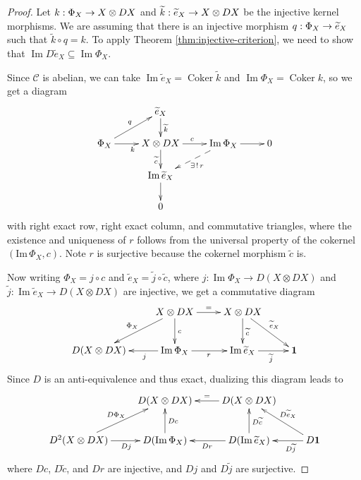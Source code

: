 \documentclass[11pt, reqno]{amsart}
\theoremstyle{definition}\newtheorem{defi}[thm]{Definition}
\theoremstyle{definition}\newtheorem{rem}[thm]{Remark}
\theoremstyle{definition}\newtheorem{exam}[thm]{Example}
\theoremstyle{definition}\newtheorem{assum}[thm]{Assumption}
\newcommand{\cC}{\mathcal{C}}
\newcommand{\til}{\widetilde}
\newcommand{\vac}{\mathbf{1}}
\DeclareMathOperator{\im}{Im}
\DeclareMathOperator{\coker}{Coker}
\let\ker\relax
\DeclareMathOperator{\ker}{Ker}
\begin{document}
\begin{proof}
Let $k: \ker\Phi_X\rightarrow X\otimes DX$ and $\til{k}: \ker\til{e}_X\rightarrow X\otimes DX$ be the injective kernel morphisms. We are assuming that there is an injective morphism $q: \ker\Phi_X\rightarrow\ker\til{e}_X$ such that $\til{k}\circ q=k$. To apply Theorem \ref{thm:injective-criterion}, we need to show that $\im D\til{e}_X\subseteq\im\Phi_X$.

Since $\cC$ is abelian, we can take $\im\til{e}_X=\coker \til{k}$ and $\im\Phi_X =\coker k$, so we get a diagram
\begin{equation*}
\xymatrixrowsep{1.5pc}
\xymatrix{
& \ker\til{e}_X \ar[d]^{\til{k}} & &\\
\ker\Phi_X \ar[ru]^q \ar[r]_k & X\otimes DX \ar[d]_{\til{c}} \ar[r]^c & \im\Phi_X \ar[r] \ar@{-->}[ld]^{\exists\,!\,r} & 0\\
& \im\til{e}_X \ar[d] &&\\
& 0 &&\\
}
\end{equation*}
with right exact row, right exact column, and commutative triangles, where the existence and uniqueness of $r$ follows from the universal property of the cokernel $(\mathrm{Im}\,\Phi_X,c)$.
Note $r$ is surjective because the cokernel morphism $\til{c}$ is. 

Now writing $\Phi_X=j\circ c$ and $\til{e}_X=\til{j}\circ\til{c}$, where $j:\im\Phi_X\rightarrow D(X\otimes DX)$ and $\til{j}: \im\til{e}_X\rightarrow D(X\otimes DX)$ are injective, we get a commutative diagram
\begin{equation*}
\xymatrix{
& X\otimes DX \ar[ld]_{\Phi_X} \ar[d]^c \ar[r]^= & X\otimes DX \ar[d]^{\til{c}} \ar[rd]^{\til{e}_X} & \\
D(X\otimes DX) & \im\Phi_X \ar[l]^(.4){j} \ar[r]_r & \im\til{e}_X \ar[r]_(.55){\til{j}} & \vac\\
}
\end{equation*}
Since $D$ is an anti-equivalence and thus exact, dualizing this diagram leads to 
\begin{equation*}
\xymatrix{
& D(X\otimes DX)    & D(X\otimes DX)  \ar[l]_= & \\
D^2(X\otimes DX) \ar[ru]^{D\Phi_X} \ar[r]_(.55){Dj} & D(\im\Phi_X) \ar[u]_{Dc}   & D(\im\til{e}_X) \ar[u]_{D\til{c}} \ar[l]^{Dr}  & D\vac\ar[l]^(.35){D\til{j}} \ar[lu]_{D\til{e}_X}\\
}
\end{equation*}
where $Dc$, $D\til{c}$, and $Dr$ are injective, and $Dj$ and $D\til{j}$ are surjective. 


\end{proof}
\end{document}
